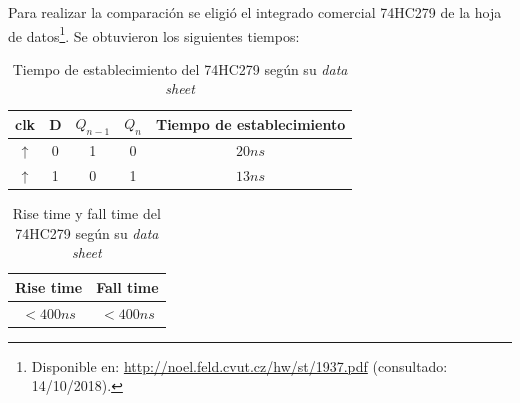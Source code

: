\documentclass[../../e3_tp2_main.tex]{subfiles}
\begin{document}
Para realizar la comparación se eligió el integrado comercial 74HC279 de la hoja de datos\footnote{Disponible en: \url{http://noel.feld.cvut.cz/hw/st/1937.pdf} (consultado: 14/10/2018).}. Se obtuvieron los siguientes tiempos:

\begin{table}[H]
\begin{center}
\begin{tabular}{|c|c|c|c|c|}
\hline
clk& D & $Q_{n-1}$ & $Q_n$ &Tiempo de establecimiento\\
\hline \hline
$\uparrow$ &0& 1&0&$20n s$  \\ \hline
$\uparrow$ &1&0&1&$13 n s$  \\ \hline
\end{tabular}
\caption{Tiempo de establecimiento del 74HC279 seg\'un su \textit{data sheet}} 
\end{center}
\end{table}

\begin{table}[H]
\begin{center}
\begin{tabular}{|c|c|}
\hline
Rise time& Fall time \\
\hline \hline
$<400 n s$  & $<400 n s$ \\ \hline
\end{tabular}
\caption{Rise time y fall time del 74HC279 seg\'un su \textit{data sheet}} 
\end{center}
\end{table}
\end{document}
